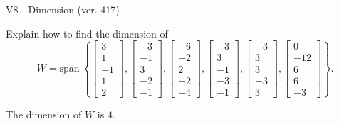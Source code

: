 \begin{exercise}
  \begin{exerciseTitle}V8 - Dimension (ver. 417)\end{exerciseTitle}
  \begin{exerciseStatement}
    Explain how to find the dimension of 
\[W=\mathrm{span}\ \left\{\left[\begin{array}{r}
3 \\
1 \\
-1 \\
1 \\
2
\end{array}\right] , \left[\begin{array}{r}
-3 \\
-1 \\
3 \\
-2 \\
-1
\end{array}\right] , \left[\begin{array}{r}
-6 \\
-2 \\
2 \\
-2 \\
-4
\end{array}\right] , \left[\begin{array}{r}
-3 \\
3 \\
-1 \\
-3 \\
-1
\end{array}\right] , \left[\begin{array}{r}
-3 \\
3 \\
3 \\
-3 \\
3
\end{array}\right] , \left[\begin{array}{r}
0 \\
-12 \\
6 \\
6 \\
-3
\end{array}\right]\right\}.\]



  \end{exerciseStatement}
  \begin{exerciseAnswer}
   The dimension of \(W\) is  \(4\).
  


  \end{exerciseAnswer}
\end{exercise}